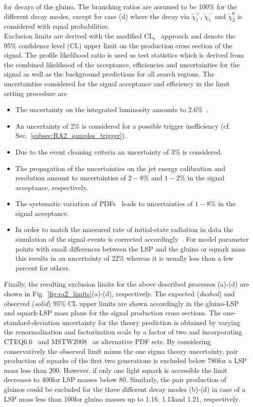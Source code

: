 for decays of the gluino. The branching ratios are assumed to be 100\% for the different decay modes, except for case (d) where the decay via $\tilde{\chi}_1^{+}$, $\tilde{\chi}_1^{-}$ and $\tilde{\chi}_2^0$ is considered with equal probabilities. \\
Exclusion limits are derived with the modified $\mathrm{CL_s}$~\cite{0954-3899-28-10-313, Thomas1999435, bib:Higgs:CLS} approach  and denote the 95\% confidence level (CL) upper limit on the production cross section of the signal. The profile likelihood ratio is used as test statistics which is derived from the combined likelihood of the acceptance, efficiencies and uncertainties for the signal as well as the background predictions for all search regions. The uncertainties considered for the signal acceptance and efficiency in the limit setting procedure are 
\begin{itemize} 
\item The uncertainty on the integrated luminosity amounts to 2.6\%~\cite{CMS-PAS-LUM-13-001}.
\item An uncertainty of 2\% is considered for a possible trigger inefficiency (cf. Sec.~\ref{subsec:RA2_samples_trigger}).
\item Due to the event cleaning criteria an uncertainty of 3\% is considered.
\item The propagation of the uncertainties on the jet energy calibration and resolution amount to uncertainties of $2-8$\% and $1-2\%$ in the signal acceptance, respectively. 
\item The systematic variation of PDFs~\cite{Botje:2011sn} leads to uncertainties of $1-8$\% in the signal acceptance. 
\item In order to match the maesured rate of initial-state radiation in data the simulation of the signal events is corrected accordingly~\cite{isrfsr}. For model parameter points with small differences between the LSP and the gluino or squark mass this results in an uncertainty of 22\% whereas it is usually less than a few percent for others.  
\end{itemize}
Finally, the resulting exclusion limits for the above described processes (a)-(d) are shown in Fig.~\ref{fig:ra2_limits}(a)-(d), respectively. The expected (\textit{dashed}) and observed (\textit{solid}) 95\% CL upper limits are shown accordingly in the gluino-LSP and squark-LSP mass plane for the signal production cross sections. The one-standard-deviation uncertainty for the theory prediction is obtained by varying the renormalization and factorization scale by a factor of two and incorporating CTEQ6.6~\cite{Nadolsky:2008zw} and MSTW2008~\cite{Martin:2009iq} as alternative PDF sets. By considering conservatively the observed limit minus the one sigma theory uncertainty, pair production of squarks of the first two generations is excluded below 780\gev for a LSP mass less than 200\gev. However, if only one light squark is accessible the limit decreases to 400\gev for LSP masses below 80\gev. Similarly, the pair production of gluinos could be excluded for the three different decay modes (b)-(d) in case of a LSP mass less than 100\gev for gluino masses up to 1.16\tev, 1.13\tev and 1.21\tev, respectively. 

